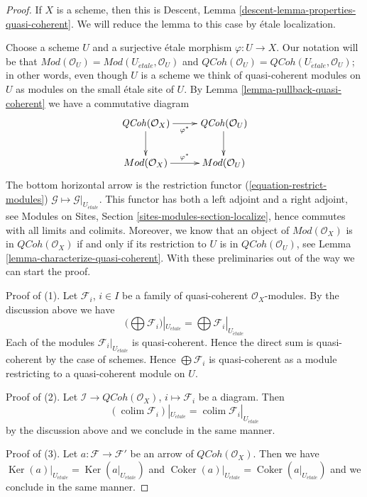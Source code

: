 \documentclass{stacks-project}
\theoremstyle{plain}
\theoremstyle{definition}
\theoremstyle{remark}
\numberwithin{equation}{subsection}
\def\colim{\mathop{\mathrm{colim}}\nolimits}
\def\etale{{\acute{e}tale}}
\def\QCoh{\mathit{QCoh}}
\def\Ker{\mathop{\mathrm{Ker}}}
\def\Coker{\mathop{\mathrm{Coker}}}
\begin{document}
\begin{proof}
If $X$ is a scheme, then this is
Descent, Lemma \ref{descent-lemma-properties-quasi-coherent}.
We will reduce the lemma to this case by \'etale localization.

\medskip\noindent
Choose a scheme $U$ and a surjective \'etale morphism $\varphi : U \to X$.
Our notation will be that $\textit{Mod}(\mathcal{O}_U) =
\textit{Mod}(U_\etale, \mathcal{O}_U)$ and
$\QCoh(\mathcal{O}_U) = \QCoh(U_\etale, \mathcal{O}_U)$; in other
words, even though $U$ is a scheme we think of quasi-coherent
modules on $U$ as modules on the small \'etale site of $U$.
By Lemma \ref{lemma-pullback-quasi-coherent} we have a commutative diagram
$$
\xymatrix{
\QCoh(\mathcal{O}_X) \ar[r]_{\varphi^*} \ar[d] &
\QCoh(\mathcal{O}_U) \ar[d] \\
\textit{Mod}(\mathcal{O}_X) \ar[r]^{\varphi^*} &
\textit{Mod}(\mathcal{O}_U)
}
$$
The bottom horizontal arrow is the restriction functor
(\ref{equation-restrict-modules})
$\mathcal{G} \mapsto \mathcal{G}|_{U_\etale}$.
This functor has both a left adjoint and a right adjoint, see
Modules on Sites, Section \ref{sites-modules-section-localize},
hence commutes with all limits and colimits.
Moreover, we know that an object of $\textit{Mod}(\mathcal{O}_X)$ is in
$\QCoh(\mathcal{O}_X)$ if and only if its restriction to $U$ is in
$\QCoh(\mathcal{O}_U)$, see
Lemma \ref{lemma-characterize-quasi-coherent}.
With these preliminaries out of the way we can start the proof.

\medskip\noindent
Proof of (1). Let $\mathcal{F}_i$, $i \in I$ be a family of quasi-coherent
$\mathcal{O}_X$-modules. By the discussion above we have
$$
\Big(\bigoplus \mathcal{F}_i\Big)|_{U_\etale} =
\bigoplus \mathcal{F}_i|_{U_\etale}
$$
Each of the modules $\mathcal{F}_i|_{U_\etale}$ is quasi-coherent.
Hence the direct sum is quasi-coherent by the case of schemes.
Hence $\bigoplus \mathcal{F}_i$ is quasi-coherent as a module
restricting to a quasi-coherent module on $U$.

\medskip\noindent
Proof of (2). Let $\mathcal{I} \to \QCoh(\mathcal{O}_X)$,
$i \mapsto \mathcal{F}_i$ be a diagram. Then
$$
(\colim \mathcal{F}_i)|_{U_\etale} = \colim \mathcal{F}_i|_{U_\etale}
$$
by the discussion above and we conclude in the same manner.

\medskip\noindent
Proof of (3). Let $a : \mathcal{F} \to \mathcal{F}'$
be an arrow of $\QCoh(\mathcal{O}_X)$. Then
we have $\Ker(a)|_{U_\etale} = \Ker(a|_{U_\etale})$
and $\Coker(a)|_{U_\etale} = \Coker(a|_{U_\etale})$
and we conclude in the same manner.


\end{proof}
\end{document}
